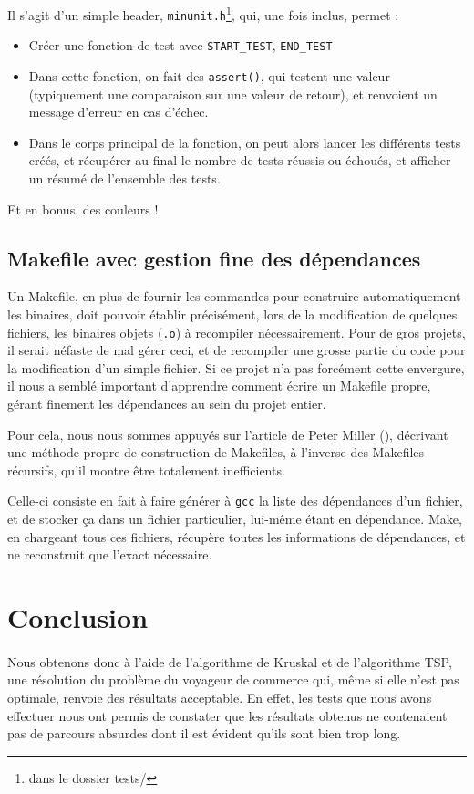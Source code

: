 \documentclass[a4paper]{article}
\begin{document}
Il s'agit d'un simple header, \texttt{minunit.h}\footnote{dans le dossier tests/}, qui, une fois inclus, permet :
\begin{itemize}
\item Créer une fonction de test avec \texttt{START\_TEST}, \texttt{END\_TEST}
\item Dans cette fonction, on fait des \texttt{assert()}, qui testent une valeur (typiquement une comparaison sur une valeur de retour), et renvoient un message d'erreur en cas d'échec.
\item Dans le corps principal de la fonction, on peut alors lancer les différents tests créés, et récupérer au final le nombre de tests réussis ou échoués, et afficher un résumé de l'ensemble des tests.
\end{itemize}

Et en bonus, des couleurs !

\subsection{Makefile avec gestion fine des dépendances}
Un Makefile, en plus de fournir les commandes pour construire automatiquement les binaires, doit pouvoir établir précisément, lors de la modification de quelques fichiers, les binaires objets (\texttt{.o}) à recompiler nécessairement. Pour de gros projets, il serait néfaste de mal gérer ceci, et de recompiler une grosse partie du code pour la modification d'un simple fichier. Si ce projet n'a pas forcément cette envergure, il nous a semblé important d'apprendre comment écrire un Makefile propre, gérant finement les dépendances au sein du projet entier. 

Pour cela, nous nous sommes appuyés sur l'article de Peter Miller (\cite{makefile}), décrivant une méthode propre de construction de Makefiles, à l'inverse des Makefiles récursifs, qu'il montre être totalement inefficients.

Celle-ci consiste en fait à faire générer à \texttt{gcc} la liste des dépendances d'un fichier, et de stocker ça dans un fichier particulier, lui-même étant en dépendance. Make, en chargeant tous ces fichiers, récupère toutes les informations de dépendances, et ne reconstruit que l'exact nécessaire.

\section*{Conclusion}
\paragraph*{}
Nous obtenons donc à l'aide de l'algorithme de Kruskal et de l'algorithme TSP, une résolution du problème du voyageur de commerce qui, même si elle n'est pas optimale, renvoie des résultats acceptable. En effet, les tests que nous avons effectuer nous ont permis de constater que les résultats obtenus ne contenaient pas de parcours absurdes dont il est évident qu'ils sont bien trop long.
\end{document}

